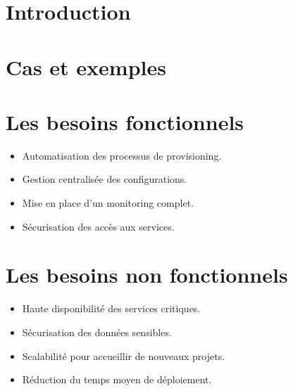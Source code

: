 \section{Introduction}


\section{Cas et exemples}


\section{Les besoins fonctionnels}


\begin{itemize}
    \item Automatisation des processus de provisioning.
    \item Gestion centralisée des configurations.
    \item Mise en place d'un monitoring complet.
    \item Sécurisation des accès aux services.
\end{itemize}

\section{Les besoins non fonctionnels}


\begin{itemize}
    \item Haute disponibilité des services critiques.
    \item Sécurisation des données sensibles.
    \item Scalabilité pour accueillir de nouveaux projets.
    \item Réduction du temps moyen de déploiement.
\end{itemize}
